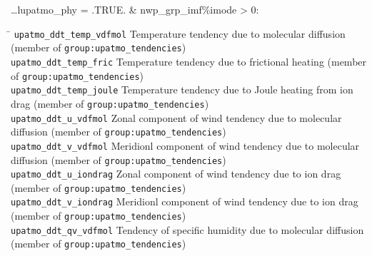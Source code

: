 \ldots lupatmo\_phy = .TRUE. \& nwp\_grp\_imf\%imode > 0:
\begin{tabbing}
\hspace*{0.4\textwidth} \= \kill
\texttt{upatmo\_ddt\_temp\_vdfmol}   \> Temperature tendency due to 
molecular diffusion (member of \texttt{group:upatmo\_tendencies}) \\
\texttt{upatmo\_ddt\_temp\_fric}   \> Temperature tendency due to 
frictional heating (member of \texttt{group:upatmo\_tendencies}) \\
\texttt{upatmo\_ddt\_temp\_joule}   \> Temperature tendency due to 
Joule heating from ion drag (member of \texttt{group:upatmo\_tendencies}) \\
\texttt{upatmo\_ddt\_u\_vdfmol}   \> Zonal component of wind tendency due to 
molecular diffusion (member of \texttt{group:upatmo\_tendencies}) \\
\texttt{upatmo\_ddt\_v\_vdfmol}   \> Meridionl component of wind tendency due to 
molecular diffusion (member of \texttt{group:upatmo\_tendencies}) \\
\texttt{upatmo\_ddt\_u\_iondrag}   \> Zonal component of wind tendency due to 
ion drag (member of \texttt{group:upatmo\_tendencies}) \\
\texttt{upatmo\_ddt\_v\_iondrag}   \> Meridionl component of wind tendency due to 
ion drag (member of \texttt{group:upatmo\_tendencies}) \\
\texttt{upatmo\_ddt\_qv\_vdfmol}   \> Tendency of specific humidity due to 
molecular diffusion (member of \texttt{group:upatmo\_tendencies}) \\
\end{tabbing}

\newpage

%

%
%


